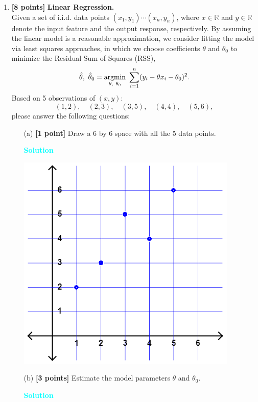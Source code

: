 \documentclass[10pt]{article}
\newenvironment{solution}
    { \begin{mdframed}[backgroundcolor=gray!10] \textcolor{cyan}{\textbf{Solution}} \\}
    {  \end{mdframed}}
\begin{document}
\begin{enumerate}
	\item \textbf{[8 points]} \textbf{Linear Regression.} \\
	      Given a set of i.i.d. data points $(x_{1},y_{1})\cdots(x_{n},y_{n})$,
	      where $x \in \mathbb{R}$ and $y \in \mathbb{R}$ denote the input feature and the output response, respectively.
	      By assuming the linear model is a reasonable approximation, we consider fitting the model via least squares approaches,
	      in which we choose coefficients $\theta$ and $\theta_0$ to minimize the Residual Sum of Squares (RSS),
	      \begin{equation}
		      \hat{\theta},~ \hat{\theta}_0 = \mathop{\rm argmin}_{\theta,~ \theta_0}~ \sum_{i=1}^{n}(y_{i} -\theta x_{i}-\theta_0)^{2}.
		      \label{eq:1}
	      \end{equation}
	      Based on 5 observations of $(x, y)$:
	      \begin{equation}
		      (1,2), \quad (2,3), \quad (3,5), \quad (4,4), \quad (5,6),
	      \end{equation}
	      please answer the following questions:
	      \begin{itemize}
		      \item[(a)] \textbf{[1 point]} Draw a 6 by 6 space with all the 5 data points.
		            \begin{solution}
			            \begin{center}
				            \includegraphics[width=.6\linewidth]{c_sol1.png}
			            \end{center}
		            \end{solution}
		      \item[(b)] \textbf{[3 points]} Estimate the model parameters $\theta$ and $\theta_0$.
		            \begin{solution}

\end{solution}
\end{itemize}
\end{enumerate}
\end{document}
